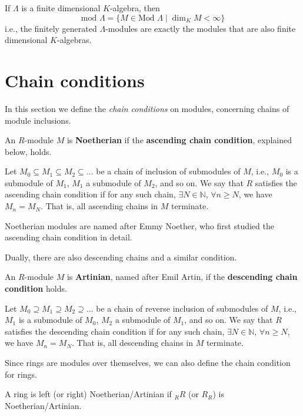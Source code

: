 \documentclass[12pt, a4paper, titlepage]{report}
\begin{document}
\begin{rem}
  If $\Lambda$ is a finite dimensional $K$-algebra, then
  \[
    \text{mod } \Lambda = \{ M \in \text{Mod } \Lambda \mid \dim_K M < \infty \}
  \]
  i.e., the finitely generated $\Lambda$-modules are exactly the modules that are also finite dimensional $K$-algebras.
\end{rem}

\section{Chain conditions}
In this section we define the \textit{chain conditions} on modules, concerning chains of module inclusions.

\begin{defn}
  An $R$-module $M$ is \textbf{Noetherian} if the \textbf{ascending chain condition}, explained below, holds.

  Let $M_0 \subseteq M_1 \subseteq M_2 \subseteq ...$ be a chain of inclusion of submodules of $M$, i.e., $M_0$ is a submodule of $M_1$,
  $M_1$ a submodule of $M_2$, and so on. We say that $R$ satisfies the ascending chain condition if for any such chain,
  $\exists N \in \mathbb{N}$, $\forall n \geq N$, we have $M_n = M_N$. That is, all ascending chains in $M$ terminate.

  Noetherian modules are named after Emmy Noether, who first studied the ascending chain condition in detail.
\end{defn}

Dually, there are also descending chains and a similar condition.

\begin{defn}
  An $R$-module $M$ is \textbf{Artinian}, named after Emil Artin, if the \textbf{descending chain condition} holds.

  Let $M_0 \supseteq M_1 \supseteq M_2 \supseteq ...$ be a chain of reverse inclusion of submodules of $M$, i.e., $M_1$ is a submodule of $M_0$,
  $M_2$ a submodule of $M_1$, and so on. We say that $R$ satisfies the descending chain condition if for any such chain,
  $\exists N \in \mathbb{N}$, $\forall n \geq N$, we have $M_n = M_N$. That is, all descending chains in $M$ terminate.
\end{defn}

Since rings are modules over themselves, we can also define the chain condition for rings.

\begin{defn}
  A ring is left (or right) Noetherian/Artinian if ${}_R R$ (or $R_R$) is Noetherian/Artinian.
\end{defn}
\end{document}
